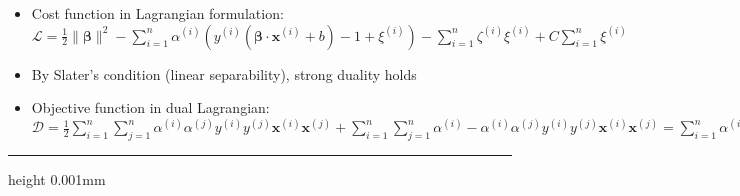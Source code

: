 \begin{itemize}
\begin{itemize}
        \item $\xi^{(i)} \geq 0$
    \end{itemize}
    \item Cost function in Lagrangian formulation: $\mathcal{L} = \frac{1}{2} \| \boldsymbol{\beta} \|^2 - \sum_{i=1}^n \alpha^{(i)} (y^{(i)} (\boldsymbol{\beta} \cdot \boldsymbol{x}^{(i)} + b) - 1 + \xi^{(i)}) - \sum_{i=1}^n \zeta^{(i)} \xi^{(i)} + C \sum_{i=1}^n \xi^{(i)}$
    \item By Slater's condition (linear separability), strong duality holds
    \item Objective function in dual Lagrangian: $\mathcal{D} = \frac{1}{2}  \sum_{i=1}^n  \sum_{j=1}^n \alpha^{(i)}\alpha^{(j)} y^{(i)}y^{(j)} \boldsymbol{x}^{(i)}\boldsymbol{x}^{(j)} + \sum_{i=1}^n  \sum_{j=1}^n \alpha^{(i)} - \alpha^{(i)}\alpha^{(j)} y^{(i)}y^{(j)} \boldsymbol{x}^{(i)}\boldsymbol{x}^{(j)} = \sum_{i=1}^n \alpha^{(i)} - \frac{1}{2}  \sum_{i=1}^n  \sum_{j=1}^n \alpha^{(i)}\alpha^{(j)} y^{(i)}y^{(j)} \boldsymbol{x}^{(i)}\boldsymbol{x}^{(j)}$
\end{itemize}

{\color{lightgray}\hrule height 0.001mm}

